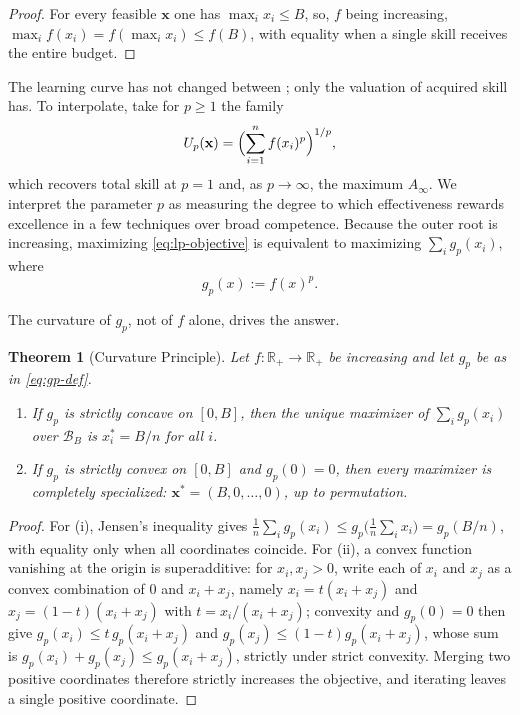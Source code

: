 \documentclass[11pt]{article}
\newtheorem{theorem}{Theorem}[section]
\theoremstyle{definition}
\theoremstyle{remark}
\newcommand{\Rplus}{\mathbb{R}_{+}}
\newcommand{\vx}{\mathbf{x}}
\newcommand{\simplex}{\mathcal{B}}
\begin{document}
\begin{proof}
For every feasible \(\vx\) one has \(\max_i x_i\leq B\), so, \(f\)
being increasing, \(\max_i f(x_i)=f(\max_i x_i)\leq f(B)\), with
equality when a single skill receives the entire budget.
\end{proof}

The learning curve has not changed between
; only the valuation
of acquired skill has. To interpolate, take for \(p\geq1\) the family
\begin{equation}
    U_p(\vx)
    =
    \Bigl(\sum_{i=1}^n f(x_i)^p\Bigr)^{1/p},
    \label{eq:lp-objective}
\end{equation}
which recovers total skill at \(p=1\) and, as \(p\to\infty\), the
maximum \(A_\infty\). We interpret the parameter \(p\) as measuring
the degree to which effectiveness rewards excellence in a few
techniques over broad competence.  Because the outer root is
increasing, maximizing \eqref{eq:lp-objective} is equivalent to
maximizing \(\sum_i g_p(x_i)\), where
\begin{equation}
    g_p(x):=f(x)^p.
    \label{eq:gp-def}
\end{equation}

The curvature of \(g_p\), not of \(f\) alone, drives the answer.

\begin{theorem}[Curvature Principle]
\label{thm:curvature-principle}
Let \(f:\Rplus\to\Rplus\) be increasing and let \(g_p\) be as in
\eqref{eq:gp-def}.
\begin{enumerate}[label=\textup{(\roman*)}]
\item If \(g_p\) is strictly concave on \([0,B]\), then the unique
maximizer of \(\sum_i g_p(x_i)\) over \(\simplex_B\) is
\(x_i^*=B/n\) for all \(i\).
\item If \(g_p\) is strictly convex on \([0,B]\) and \(g_p(0)=0\),
  then every maximizer is completely specialized:
  \(\vx^*=(B,0,\ldots,0)\), up to permutation.
\end{enumerate}
\end{theorem}

\begin{proof}
For (i), Jensen's inequality \citep[\S3.1]{hardy1952inequalities}
gives \(\frac1n\sum_i g_p(x_i)\leq g_p\bigl(\frac1n\sum_i
x_i\bigr)=g_p(B/n)\), with equality only when all coordinates
coincide. For (ii), a convex function vanishing at the origin is
superadditive: for \(x_i,x_j>0\), write each of \(x_i\) and \(x_j\) as
a convex combination of \(0\) and \(x_i+x_j\), namely
\(x_i=t(x_i+x_j)\) and \(x_j=(1-t)(x_i+x_j)\) with
\(t=x_i/(x_i+x_j)\); convexity and \(g_p(0)=0\) then give
\(g_p(x_i)\leq t\,g_p(x_i+x_j)\) and
\(g_p(x_j)\leq(1-t)g_p(x_i+x_j)\), whose sum is
\(g_p(x_i)+g_p(x_j)\leq g_p(x_i+x_j)\), strictly under strict
convexity.  Merging two positive coordinates therefore strictly
increases the objective, and iterating leaves a single positive
coordinate.
\end{proof}
\end{document}
